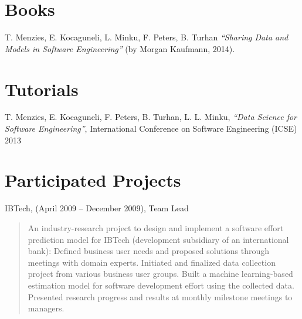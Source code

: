 \documentclass[margin]{res}
\begin{document}
\begin{resume}
\begin{list}{}{\leftmargin=0.5em}

\end{list}

\section{Books}
\begin{list}{}{\leftmargin=0.5em}
\item T. Menzies, E. Kocaguneli, L. Minku, F. Peters, B. Turhan \textit{``Sharing Data and Models in Software Engineering''} (by Morgan Kaufmann, 2014).
\end{list}

\section{Tutorials}

\begin{list}{}{\leftmargin=0.5em}
\item T. Menzies, E. Kocaguneli, F. Peters, B. Turhan, L. L. Minku, \textit{``Data Science for Software Engineering''}, International Conference on Software Engineering (ICSE) 2013
\end{list}

\section{Participated Projects} 

\begin{list}{}{\leftmargin=0.5em}

\item IBTech, (April 2009 -- December 2009), Team Lead
\begin{quote}
An industry-research project to design and implement a software effort prediction model for IBTech (development subsidiary of an international bank):
Defined business user needs and proposed solutions through meetings with domain experts.
Initiated and finalized data collection project from various business user groups.
Built a machine learning-based estimation model for software development effort using the collected data.
Presented research progress and results at monthly milestone meetings to managers.
\end{quote}


\end{list}
\end{resume}
\end{document}
